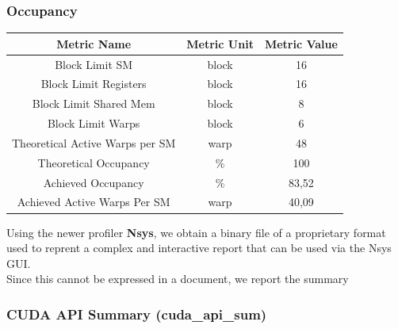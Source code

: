 \documentclass[a4paper, 12pt, oneside]{article}
\begin{document}
\subsubsection{Occupancy}

\begin{center}
  \begin{tabular}{ |c|c|c| }
    \hline
    Metric Name                     & Metric Unit & Metric Value \\
    \hline
    Block Limit SM                  & block       & 16           \\
    Block Limit Registers           & block       & 16           \\
    Block Limit Shared Mem          & block       & 8            \\
    Block Limit Warps               & block       & 6            \\
    Theoretical Active Warps per SM & warp        & 48           \\
    Theoretical Occupancy           & \%          & 100          \\
    Achieved Occupancy              & \%          & 83,52        \\
    Achieved Active Warps Per SM    & warp        & 40,09        \\
    \hline
  \end{tabular}
\end{center}

Using the newer profiler \textbf{Nsys}, we obtain a binary file of a proprietary format used to reprent a complex and interactive report that can be used via the Nsys GUI.\\
Since this cannot be expressed in a document, we report the summary

\subsubsection{CUDA API Summary (cuda\_api\_sum)}
\end{document}
